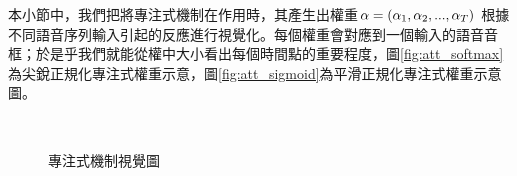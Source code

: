 本小節中，我們把將專注式機制在作用時，其產生出權重$\bold{\alpha} =(
\alpha_1,\alpha_2,...,\alpha_T)$
根據不同語音序列輸入引起的反應進行視覺化。每個權重會對應到一個輸入的語音音框；於是乎我們就能從權中大小看出每個時間點的重要程度，圖\ref{fig:att_softmax}為尖銳正規化專注式權重示意，圖\ref{fig:att_sigmoid}為平滑正規化專注式權重示意圖。
\begin{figure}[hb]
\centering
{}
\\
\caption{專注式機制視覺圖}
\end{figure}


